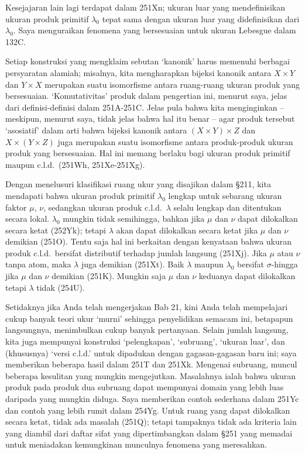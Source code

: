 {Kesejajaran lain lagi terdapat dalam 251Xn; ukuran luar yang mendefinisikan
ukuran produk primitif $\lambda_0$ tepat sama dengan ukuran luar
yang didefinisikan dari $\lambda_0$. Saya menguraikan fenomena yang bersesuaian
untuk ukuran Lebesgue dalam 132C.

Setiap konstruksi yang mengklaim sebutan `kanonik' harus
memenuhi berbagai persyaratan alamiah; misalnya, kita mengharapkan
bijeksi kanonik antara $X\times Y$ dan $Y\times X$ merupakan suatu
isomorfisme antara ruang-ruang ukuran produk yang bersesuaian.
`Komutativitas' produk dalam pengertian ini, menurut saya, jelas dari
definisi-definisi dalam 251A-251C. Jelas pula bahwa kita menginginkan -- meskipun, menurut
saya, tidak jelas bahwa hal itu benar -- agar produk tersebut `asosiatif' dalam arti
bahwa bijeksi kanonik antara $(X\times Y)\times Z$ dan
$X\times(Y\times Z)$ juga merupakan suatu isomorfisme antara
produk-produk ukuran produk yang bersesuaian. Hal ini memang berlaku bagi
ukuran produk primitif maupun c.l.d.\ (251Wh, 251Xe-251Xg).

Dengan menelusuri klasifikasi ruang ukur yang disajikan dalam
\S211, kita mendapati bahwa ukuran produk primitif $\lambda_0$ lengkap
untuk sebarang ukuran faktor $\mu$, $\nu$, sedangkan ukuran produk c.l.d.\
$\lambda$ selalu lengkap dan ditentukan secara lokal.
$\lambda_0$ mungkin tidak
semihingga, bahkan jika $\mu$ dan $\nu$ dapat dilokalkan secara ketat
(252Yk); tetapi $\lambda$ akan dapat dilokalkan secara ketat jika $\mu$ dan
$\nu$ demikian (251O). Tentu saja hal ini berkaitan dengan kenyataan bahwa
ukuran produk c.l.d.\ bersifat distributif terhadap jumlah langsung (251Xj). Jika
$\mu$ atau $\nu$ tanpa atom, maka $\lambda$ juga demikian (251Xt). Baik
$\lambda$ maupun $\lambda_0$ bersifat $\sigma$-hingga jika $\mu$
dan $\nu$ demikian (251K). Mungkin saja $\mu$ dan $\nu$ keduanya
dapat dilokalkan tetapi $\lambda$ tidak (254U).

Setidaknya jika Anda telah mengerjakan Bab 21, kini Anda telah mempelajari cukup banyak
teori ukur `murni' sehingga penyelidikan semacam ini, betapapun
langsungnya, menimbulkan cukup banyak pertanyaan. Selain jumlah
langsung, kita juga mempunyai konstruksi `pelengkapan', `subruang', `ukuran
luar', dan (khususnya) `versi c.l.d.' untuk dipadukan dengan gagasan-gagasan
baru ini; saya memberikan beberapa hasil dalam 251T dan 251Xk. Mengenai
subruang, muncul beberapa kesulitan yang mungkin mengejutkan. Masalahnya ialah bahwa
ukuran produk pada produk dua subruang dapat mempunyai domain yang lebih luas
daripada yang mungkin diduga. Saya memberikan contoh sederhana dalam 251Yc dan contoh yang lebih
rumit dalam 254Yg. Untuk ruang yang dapat dilokalkan secara ketat, tidak ada
masalah (251Q); tetapi tampaknya tidak ada kriteria lain yang diambil dari daftar
sifat yang dipertimbangkan dalam \S251 yang memadai untuk meniadakan
kemungkinan munculnya fenomena yang meresahkan.

}%

\discrpage

